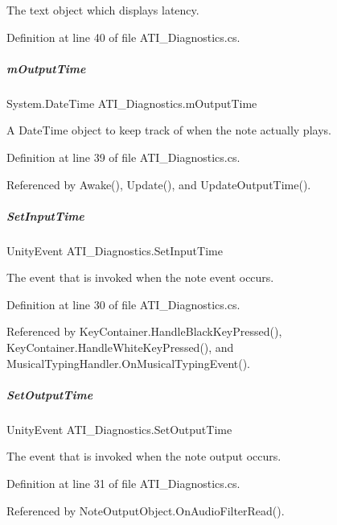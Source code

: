 The text object which displays latency. 



Definition at line 40 of file A\+T\+I\+\_\+\+Diagnostics.\+cs.

\mbox{\label{group___audio_testing_a2e6f675a990948db789381f52071e1bf}} 
\subparagraph{\texorpdfstring{m\+Output\+Time}{mOutputTime}}
{\footnotesize\ttfamily System.\+Date\+Time A\+T\+I\+\_\+\+Diagnostics.\+m\+Output\+Time\hspace{0.3cm}{\ttfamily [private]}}



A Date\+Time object to keep track of when the note actually plays. 



Definition at line 39 of file A\+T\+I\+\_\+\+Diagnostics.\+cs.



Referenced by Awake(), Update(), and Update\+Output\+Time().

\mbox{\label{group___audio_testing_a133561901c2aef535b2f3c098e55b959}} 
\subparagraph{\texorpdfstring{Set\+Input\+Time}{SetInputTime}}
{\footnotesize\ttfamily Unity\+Event A\+T\+I\+\_\+\+Diagnostics.\+Set\+Input\+Time}



The event that is invoked when the note event occurs. 



Definition at line 30 of file A\+T\+I\+\_\+\+Diagnostics.\+cs.



Referenced by Key\+Container.\+Handle\+Black\+Key\+Pressed(), Key\+Container.\+Handle\+White\+Key\+Pressed(), and Musical\+Typing\+Handler.\+On\+Musical\+Typing\+Event().

\mbox{\label{group___audio_testing_a6360e6098323b921b4a1b306914d06ef}} 
\subparagraph{\texorpdfstring{Set\+Output\+Time}{SetOutputTime}}
{\footnotesize\ttfamily Unity\+Event A\+T\+I\+\_\+\+Diagnostics.\+Set\+Output\+Time}



The event that is invoked when the note output occurs. 



Definition at line 31 of file A\+T\+I\+\_\+\+Diagnostics.\+cs.



Referenced by Note\+Output\+Object.\+On\+Audio\+Filter\+Read().

